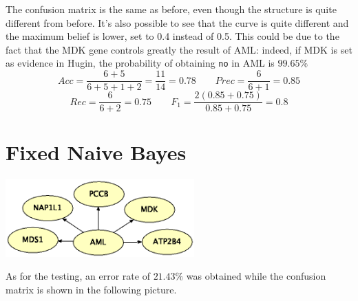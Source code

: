 The confusion matrix is the same as before, even though the structure is quite different from before. It's also possible to see that the curve is quite different and the maximum belief is lower, set to 0.4 instead of 0.5. This could be due to the fact that the MDK gene controls greatly the result of AML: indeed, if MDK is set as evidence in Hugin, the probability of obtaining \texttt{no} in AML is $99.65\%$
\[Acc=\frac{6+5}{6+5+1+2}=\frac{11}{14}=0.78\qquad Prec=\frac{6}{6+1}=0.85\]
\[Rec=\frac{6}{6+2}=0.75\qquad F_1=\frac{2(0.85+0.75)}{0.85+0.75}=0.8\]
%
%
%

\section*{Fixed Naive Bayes}
\begin{center}
	\includegraphics[height=3cm]{images/FixedNaiveBayes}
\end{center}
As for the testing, an error rate of $21.43\%$ was obtained while the confusion matrix is shown in the following picture.
